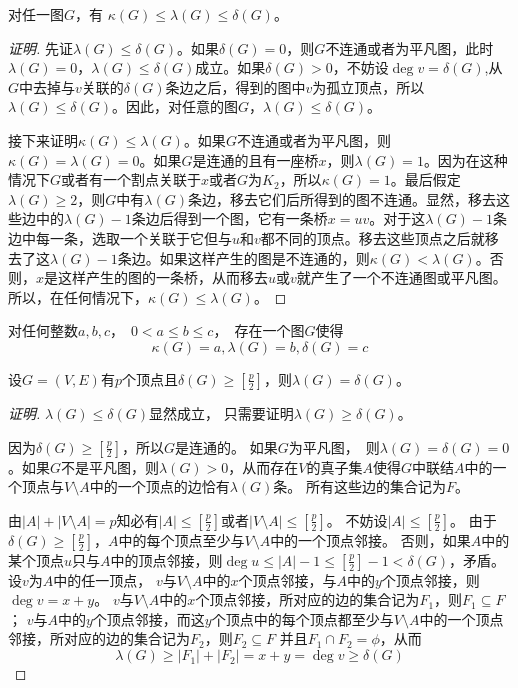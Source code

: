   \begin{Thm}
    对任一图$G$，有 $\kappa (G) \leq \lambda (G) \leq \delta (G)$。
  \end{Thm}
  \begin{proof}[证明]
    先证$\lambda (G) \leq \delta (G)$。如果$\delta(G) = 0$，则$G$不连通或者为平凡图，此时$\lambda(G) = 0$，$\lambda(G)\leq \delta(G)$成立。如果$\delta(G)>0$，不妨设$\deg v = \delta(G)$,从$G$中去掉与$v$关联的$\delta(G)$条边之后，得到的图中$v$为孤立顶点，所以$\lambda(G) \leq \delta(G)$。因此，对任意的图$G$，$\lambda(G)\leq \delta(G)$。

    接下来证明$\kappa (G) \leq \lambda (G)$。如果$G$不连通或者为平凡图，则$\kappa(G)=\lambda(G)=0$。如果$G$是连通的且有一座桥$x$，则$\lambda(G)=1$。因为在这种情况下$G$或者有一个割点关联于$x$或者$G$为$K_2$，所以$\kappa(G)=1$。最后假定$\lambda(G)\geq 2$，则$G$中有$\lambda(G)$条边，移去它们后所得到的图不连通。显然，移去这些边中的$\lambda(G)-1$条边后得到一个图，它有一条桥$x=uv$。对于这$\lambda(G)-1$条边中每一条，选取一个关联于它但与$u$和$v$都不同的顶点。移去这些顶点之后就移去了这$\lambda(G)-1$条边。如果这样产生的图是不连通的，则$\kappa(G) < \lambda(G)$。否则，$x$是这样产生的图的一条桥，从而移去$u$或$v$就产生了一个不连通图或平凡图。所以，在任何情况下，$\kappa(G) \leq \lambda(G)$。
  \end{proof}

    \begin{Thm}
    对任何整数$a,b,c$，　$0 < a \leq b \leq c$，　存在一个图$G$使得\[\kappa (G)
      = a, \lambda (G) = b, \delta (G) = c\]
  \end{Thm}

    \begin{Thm}
    设$G=(V,E)$有$p$个顶点且$\delta(G) \geq [ \frac{p}{2} ]$，则$\lambda(G) = \delta(G)$。
  \end{Thm}
  \begin{proof}[证明]
     $\lambda(G) \leq \delta(G)$显然成立， 只需要证明$\lambda(G) \geq \delta(G)$。

     

    因为$\delta(G) \geq [\frac{p}{2}]$，所以$G$是连通的。 如果$G$为平凡图，　则$\lambda (G) = \delta(G) = 0$。如果$G$不是平凡图，则$\lambda(G) > 0$，从而存在$V$的真子集$A$使得$G$中联结$A$中的一个顶点与$V\setminus A$中的一个顶点的边恰有$\lambda(G)$条。 所有这些边的集合记为$F$。

   由$|A| + |V\setminus A| = p$知必有$|A| \leq [\frac{p}{2}]$或者$|V\setminus A| \leq [\frac{p}{2}]$。 不妨设$|A| \leq [\frac{p}{2}]$。  由于$\delta(G) \geq [\frac{p}{2}]$，$A$中的每个顶点至少与$V\setminus A$中的一个顶点邻接。 否则，如果$A$中的某个顶点$u$只与$A$中的顶点邻接，则$\deg u \leq |A|-1 \leq [\frac{p}{2}] - 1 < \delta(G)$，矛盾。 
    设$v$为$A$中的任一顶点， $v$与$V\setminus A$中的$x$个顶点邻接，与$A$中的$y$个顶点邻接，则$\deg v = x + y$。  $v$与$V\setminus A$中的$x$个顶点邻接，所对应的边的集合记为$F_1$，则$F_1 \subseteq F$；
    $v$与$A$中的$y$个顶点邻接，而这$y$个顶点中的每个顶点都至少与$V\setminus A$中的一个顶点邻接，所对应的边的集合记为$F_2$，则$F_2 \subseteq F$ 并且$F_1 \cap F_2 = \phi$，从而
    \[\lambda(G) \geq |F_1| + |F_2| = x + y = \deg v \geq  \delta(G)\]
  \end{proof}

